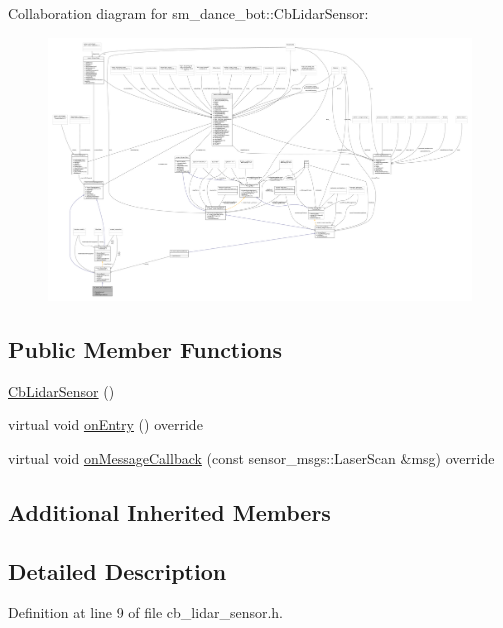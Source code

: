 Collaboration diagram for sm\+\_\+dance\+\_\+bot\+:\+:Cb\+Lidar\+Sensor\+:
\nopagebreak
\begin{figure}[H]
\begin{center}
\leavevmode
\includegraphics[width=350pt]{structsm__dance__bot_1_1CbLidarSensor__coll__graph}
\end{center}
\end{figure}
\subsection*{Public Member Functions}
\begin{DoxyCompactItemize}
\item 
\hyperlink{structsm__dance__bot_1_1CbLidarSensor_ac290e566a0a47a196ad68ac196bc3b4f}{Cb\+Lidar\+Sensor} ()
\item 
virtual void \hyperlink{structsm__dance__bot_1_1CbLidarSensor_ab3d6ddb06d7c9777f8522c89f40b0606}{on\+Entry} () override
\item 
virtual void \hyperlink{structsm__dance__bot_1_1CbLidarSensor_a740089a27e2d2b91d0fcbd7d804ede8a}{on\+Message\+Callback} (const sensor\+\_\+msgs\+::\+Laser\+Scan \&msg) override
\end{DoxyCompactItemize}
\subsection*{Additional Inherited Members}


\subsection{Detailed Description}


Definition at line 9 of file cb\+\_\+lidar\+\_\+sensor.\+h.



